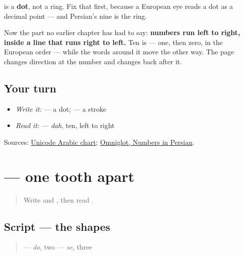 \textbf{} is a \textbf{dot}, not a ring. Fix that first, because a European eye reads a dot as a decimal point — and Persian's nine is the ring.

Now the part no earlier chapter has had to say: \textbf{numbers run left to right, inside a line that runs right to left.} Ten is \textbf{} — one, then zero, in the European order — while the words around it move the other way. The page changes direction at the number and changes back after it.

\subsection*{Your turn}
\begin{itemize}
\raggedright
  \item \emph{Write it:} \textbf{} — a dot; \textbf{} — a stroke
  \item \emph{Read it:} \textbf{} — \emph{dah}, ten, left to right
\end{itemize}

\begin{tcolorbox}[breakable,colback=teal!4,colframe=teal!35!black,title={Before you move on}]
Sources: \href{https://www.unicode.org/charts/PDF/U0600.pdf}{Unicode Arabic chart}; \href{https://www.omniglot.com/language/numbers/persian.htm}{Omniglot, Numbers in Persian}.
\end{tcolorbox}
\section[\texorpdfstring{\fa{۲} \fa{۳} (do se)}{۲ ۳ (do se)}]{  — one tooth apart}

\label{lesson:FA-W19-digits-two-three}



\begin{quote}
Write \textbf{} and \textbf{}, then read \textbf{}.
\end{quote}

\subsection*{Script — the shapes}

\begin{quote}
\textbf{} — \emph{do}, two  \textbf{} — \emph{se}, three
\end{quote}

